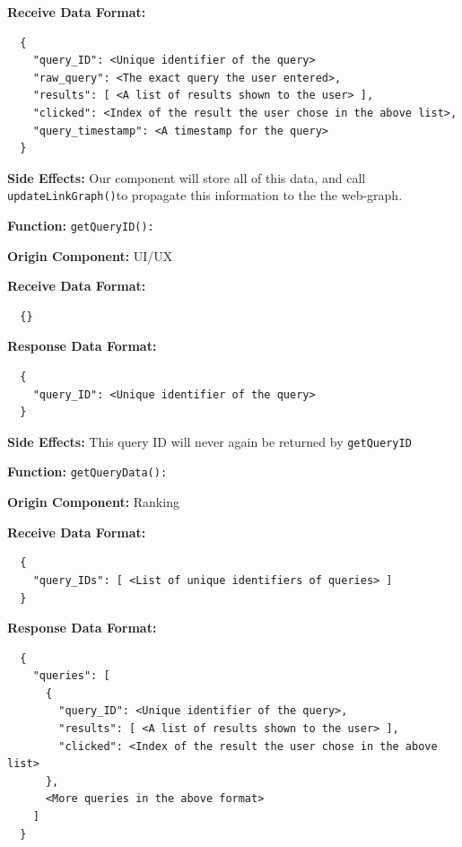 \smallskip

\textbf{Receive Data Format:} \begin{verbatim}
  {
    "query_ID": <Unique identifier of the query>
    "raw_query": <The exact query the user entered>,
    "results": [ <A list of results shown to the user> ],
    "clicked": <Index of the result the user chose in the above list>,
    "query_timestamp": <A timestamp for the query>
  }
\end{verbatim}

\smallskip

\textbf{Side Effects:} Our component will store all of this data, and call \verb|updateLinkGraph()|to propagate this information to the the web-graph.

\newpage

\textbf{Function:} \verb|getQueryID():|

\smallskip

\textbf{Origin Component:} UI/UX

\smallskip

\textbf{Receive Data Format:} \begin{verbatim}
  {}
\end{verbatim}

\textbf{Response Data Format:} \begin{verbatim}
  {
    "query_ID": <Unique identifier of the query>
  }
\end{verbatim}

\smallskip

\textbf{Side Effects:} This query ID will never again be returned by \verb|getQueryID|

\bigskip

\textbf{Function:} \verb|getQueryData():|

\smallskip

\textbf{Origin Component:} Ranking

\smallskip

\textbf{Receive Data Format:} \begin{verbatim}
  {
    "query_IDs": [ <List of unique identifiers of queries> ]
  }
\end{verbatim}

\textbf{Response Data Format:} \begin{verbatim}
  {
    "queries": [
      {
        "query_ID": <Unique identifier of the query>,
        "results": [ <A list of results shown to the user> ],
        "clicked": <Index of the result the user chose in the above list>
      }, 
      <More queries in the above format>
    ]
  }
\end{verbatim}


